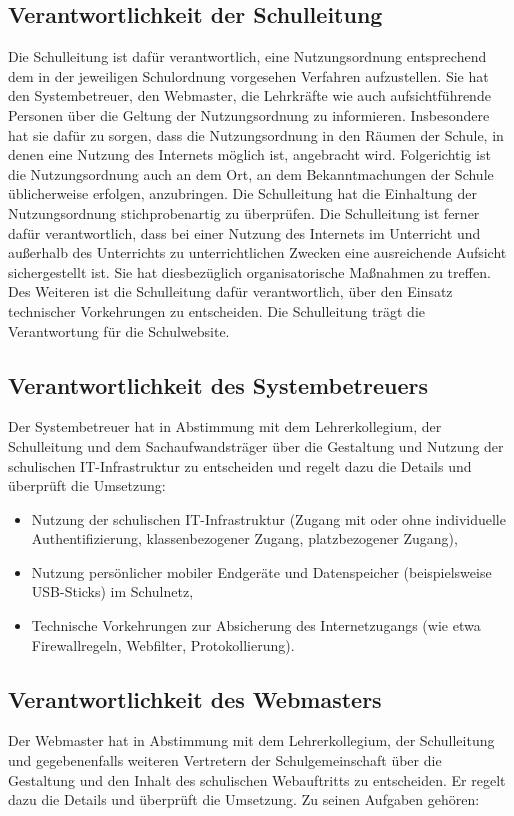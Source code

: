 \documentclass[a4paper, parskip]{scrartcl}
\begin{document}
\subsection{Verantwortlichkeit der Schulleitung}
Die Schulleitung ist dafür verantwortlich, eine Nutzungsordnung entsprechend
dem in der jeweiligen Schulordnung vorgesehen Verfahren aufzustellen. Sie hat
den Systembetreuer, den Webmaster, die Lehrkräfte wie auch aufsichtführende
Personen über die Geltung der Nutzungsordnung zu informieren. Insbesondere hat
sie dafür zu sorgen, dass die Nutzungsordnung in den Räumen der Schule, in
denen eine Nutzung des Internets möglich ist, angebracht wird. Folgerichtig ist
die Nutzungsordnung auch an dem Ort, an dem Bekanntmachungen der Schule
üblicherweise erfolgen, anzubringen. Die Schulleitung hat die Einhaltung der
Nutzungsordnung stichprobenartig zu überprüfen. Die Schulleitung ist ferner
dafür verantwortlich, dass bei einer Nutzung des Internets im Unterricht und
außerhalb des Unterrichts zu unterrichtlichen Zwecken eine ausreichende
Aufsicht sichergestellt ist. Sie hat diesbezüglich organisatorische Maßnahmen
zu treffen. Des Weiteren ist die Schulleitung dafür verantwortlich, über den
Einsatz technischer Vorkehrungen zu entscheiden.
Die Schulleitung trägt die Verantwortung für die Schulwebsite.
\subsection{Verantwortlichkeit des Systembetreuers}
Der Systembetreuer hat in Abstimmung mit dem Lehrerkollegium, der Schulleitung
und dem Sachaufwandsträger über die Gestaltung und Nutzung der schulischen
IT-Infrastruktur zu entscheiden und regelt dazu die Details und überprüft die
Umsetzung:

\begin{itemize}
	\item{Nutzung der schulischen IT-Infrastruktur (Zugang mit oder ohne
		individuelle Authentifizierung, klassenbezogener Zugang,
	platzbezogener Zugang),}
	\item{Nutzung persönlicher mobiler Endgeräte und Datenspeicher
		(beispielsweise USB-Sticks) im Schulnetz,}
	\item{Technische Vorkehrungen zur Absicherung des Internetzugangs (wie
		etwa Firewallregeln, Webfilter, Protokollierung).}
\end{itemize}

\subsection{Verantwortlichkeit des Webmasters}
Der Webmaster hat in Abstimmung mit dem Lehrerkollegium, der Schulleitung und
gegebenenfalls weiteren Vertretern der Schulgemeinschaft über die Gestaltung
und den Inhalt des schulischen Webauftritts zu entscheiden. Er regelt dazu die
Details und überprüft die Umsetzung. Zu seinen Aufgaben gehören:
\end{document}
